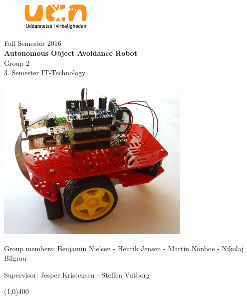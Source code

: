 \clearpage
\thispagestyle{empty}

\begin{figure}[H]
	\raggedleft
		\includegraphics[width=0.3\textwidth]{figures/logo-ucn.png}
\end{figure}
\vspace*{\fill} 
\begin{center}
\begin{Huge}
Fall Semester 2016\\
\vspace{5 mm}
\textbf{Autonomous Object Avoidance Robot}\\
\vspace{3 mm}
Group 2\\
\vspace{3 mm}
3. Semester IT-Technology
\end{Huge}
\includegraphics[width=0.7\textwidth]{figures/Forsidebil.PNG}
\end{center}
\vspace*{\fill}
\begin{center}
Group members:
 Benjamin Nielsen - Henrik Jensen - Martin Nonboe - Nikolaj Bilgrau
\end{center}
\begin{center}
Supervisor: Jesper Kristensen -  Steffen Vutborg
\end{center}
\begin{center}
\line(1,0){400}
\end{center}